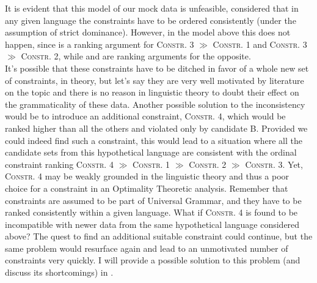 It is evident that this model of our mock data is unfeasible, considered that in any given language the constraints have to be ordered consistently (under the assumption of strict dominance). However, in the model above this does not happen, since  is a ranking argument for \textsc{Constr. 3} $\gg$ \textsc{Constr. 1} and \textsc{Constr. 3} $\gg$ \textsc{Constr. 2}, while  and  are ranking arguments for the opposite.\\
It's possible that these constraints have to be ditched in favor of a whole new set of constraints, in theory, but let's say they are very well motivated by literature on the topic and there is no reason in linguistic theory to doubt their effect on the grammaticality of these data. Another possible solution to the inconsistency would be to introduce an additional constraint, \textsc{Constr. 4}, which would be ranked higher than all the others and violated only by candidate B. Provided we could indeed find such a constraint, this would lead to a situation where all the candidate sets from this hypothetical language are consistent with the ordinal constraint ranking \textsc{Constr. 4} $\gg$ \textsc{Constr. 1} $\gg$ \textsc{Constr. 2} $\gg$ \textsc{Constr. 3}. Yet, \textsc{Constr. 4} may be weakly grounded in the linguistic theory and thus a poor choice for a constraint in an Optimality Theoretic analysis. Remember that constraints are assumed to be part of Universal Grammar, and they have to be ranked consistently within a given language. What if \textsc{Constr. 4} is found to be incompatible with newer data from the same hypothetical language considered above? The quest to find an additional suitable constraint could continue, but the same problem would resurface again and lead to an unmotivated number of constraints very quickly. I will provide a possible solution to this problem (and discuss its shortcomings) in . %
